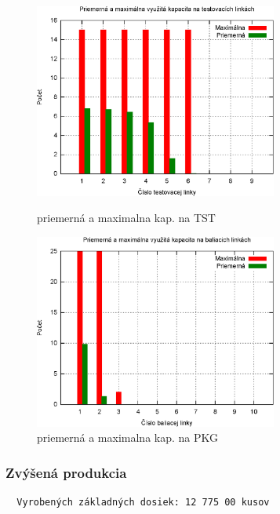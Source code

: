 \documentclass[12pt,a4paper,titlepage,final]{article}
\begin{document}
\begin{figure}[!h]
  \centering
  \begin{minipage}{0.45\linewidth}
  \centering
  \includegraphics[width=8cm]{doc/2_hist5.eps}
  \caption{priemerná a maximalna kap. na TST}
  \end{minipage}
  \quad
  \begin{minipage}{0.45\linewidth}
    \centering
    \includegraphics[width=8cm]{doc/2_hist6.eps}
    \caption{priemerná a maximalna kap. na PKG}
  \end{minipage}
\end{figure}

\newpage

\subsubsection{Zvýšená produkcia}

\begin{verbatim}
  Vyrobených základných dosiek: 12 775 00 kusov
\end{verbatim}
\end{document}
